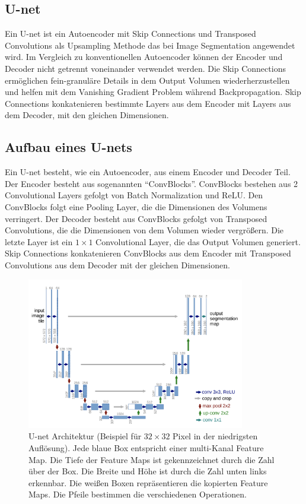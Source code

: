 \subsection{U-net}\label{section:u-net}
Ein U-net ist ein Autoencoder mit Skip Connections und Transposed Convolutions als Upsampling Methode das bei Image Segmentation angewendet wird.
Im Vergleich zu konventionellen Autoencoder können der Encoder und Decoder nicht getrennt voneinander verwendet werden. Die Skip Connections
ermöglichen fein-granuläre Details in dem Output Volumen wiederherzustellen und helfen mit dem Vanishing Gradient Problem während Backpropagation.
Skip Connections konkatenieren bestimmte Layers aus dem Encoder mit Layers aus dem Decoder, mit den gleichen Dimensionen.
\\
\subsection{Aufbau eines U-nets}\label{section:aufbau-u-net}
Ein U-net besteht, wie ein Autoencoder, aus einem Encoder und Decoder Teil. Der Encoder besteht aus sogenannten ``ConvBlocks''. ConvBlocks
bestehen aus 2 Convolutional Layers gefolgt von Batch Normalization und ReLU. Den ConvBlocks folgt
eine Pooling Layer, die die Dimensionen des Volumens verringert. Der Decoder besteht aus ConvBlocks gefolgt von Transposed Convolutions,
die die Dimensionen von dem Volumen wieder vergrößern. Die letzte Layer ist ein $1 \times 1$ Convolutional Layer, die das Output Volumen generiert.
Skip Connections konkatenieren ConvBlocks aus dem Encoder mit Transposed Convolutions aus dem Decoder mit der gleichen Dimensionen.

\begin{figure}[H]
  \centering
  \includegraphics[width=0.85\textwidth]{resources/networks/unet.png}
  \caption{
    U-net Architektur (Beispiel für $32 \times 32$ Pixel in der niedrigsten Auflösung). Jede blaue Box entspricht einer multi-Kanal Feature Map.
    Die Tiefe der Feature Maps ist gekennzeichnet durch die Zahl über der Box. Die Breite und Höhe ist durch die Zahl unten links erkennbar.
    Die weißen Boxen repräsentieren die kopierten Feature Maps. Die Pfeile bestimmen die verschiedenen Operationen.
    \cite{ronneberger2015unet}
  }
  \label{image:unet}
\end{figure}

